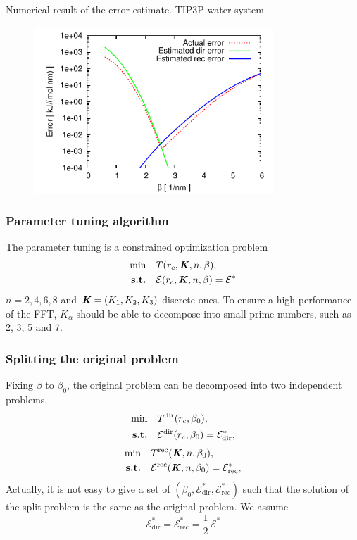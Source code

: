 \documentclass{beamer}
\newcommand{\redc}[1]{{\color{red} #1}}
\newcommand{\bluec}[1]{{\color{blue} #1}}
\renewcommand{\v}[1]{\textbf{\textit{#1}}}
\begin{document}
\begin{frame}{Numerical result of the error estimate. TIP3P water system}
  \begin{figure}
    \includegraphics[width=0.8\textwidth]{figs/long-range//tip3p.pdf}
  \end{figure} \hfill
\end{frame}


\begin{frame}
  \frametitle{Parameter tuning algorithm} 
  The parameter tuning is a constrained optimization problem \bluec{
  \begin{align*} 
    \min\quad &  T (r_c, \v K, n, \beta),\\
    \textrm{\textbf{s.t.}}\quad & \mathcal E (r_c, \v K, n, \beta) = \mathcal E^\ast
  \end{align*}}
  $n = 2, 4, 6, 8$ and $\v K = (K_1, K_2, K_3)$ discrete ones. To
  ensure a high performance of the FFT, $K_\alpha$ should be able to
  decompose into small prime numbers, such as 2, 3, 5 and 7.
\end{frame}

\begin{frame}[label=tune-assumption]
  \frametitle{Splitting the original problem} Fixing $\beta$ to
  \redc{$\beta_0$}, the original problem can be decomposed into two
  \redc{independent} problems.\bluec{
  \begin{align*}
    \min\quad & 
    T^{\textrm{dir}} (r_c, \beta_0), \\* 
    \textrm{\textbf{s.t.}}\quad & 
    \mathcal E^{\textrm{dir}} (r_c, \beta_0) = \mathcal E^\ast_{\textrm{dir}},
  \end{align*}}
  \vskip -1.2cm\bluec{
  \begin{align*}
    \min\quad & 
    T^{\textrm{rec}} (\v K, n, \beta_0), \\* 
    \textrm{\textbf{s.t.}}\quad & 
    \mathcal E^{\textrm{rec}} (\v K, n, \beta_0) = \mathcal E^\ast_{\textrm{rec}},
  \end{align*}}
  Actually, it is not easy to give a set of $(\beta_0,
  \mathcal E^\ast_{\textrm{dir}}, \mathcal E^\ast_{\textrm{rec}})$
  such that the solution of the split problem is the same as the
  original problem. We assume\redc{
  $$\mathcal E^\ast_{\textrm{dir}} = \mathcal E^\ast_{\textrm{rec}} =
  \frac12\, \mathcal E^\ast$$}
\vfill\hfill
\hyperlink{figure-fix-order}{}
\end{frame}
\end{document}
